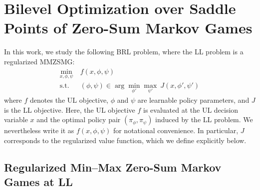 \documentclass{article}
\theoremstyle{plain}
\theoremstyle{definition}
\theoremstyle{remark}
\newcommand{\st}{{\mathrm{s.t.}}}
\def\R{\mathbb R}
\def\cA{\mathcal A}
\def\cB{\mathcal B}
\def\cM{\mathcal M}
\def\cP{\mathcal P}
\def\cS{\mathcal S}
\begin{document}
\section{Bilevel Optimization over Saddle Points of Zero-Sum Markov Games}
\vspace{-1mm}
\label{sec: problem-formulation}

In this work, we study the following BRL problem, where the LL problem is a regularized MMZSMG:
\vspace{-2mm}
\begin{subequations}\label{problem: bilevel-min-max} 
\begin{align} 
\min_{x, \phi,\psi} & \ f(x, \phi,\psi) 
\\ 
\st & \ (\phi,\psi) \in \arg\min_{\phi'}\max_{\psi'} \ J(x,\phi',\psi') \label{eq.minmaxgame}
\end{align}  
\end{subequations}
where $f$ denotes the UL objective, $\phi$ and $\psi$ are learnable policy parameters, and $J$ is the LL objective. Here, the UL objective $f$ is evaluated at the UL decision variable $x$ and the optimal policy pair $(\pi_\phi,\pi_\psi)$ induced by the LL problem. 
We nevertheless write it as $f(x,\phi,\psi)$ for notational convenience. In particular, $J$ corresponds to the regularized value function, which we define explicitly below. 

\vspace{-2mm}
\subsection{Regularized Min--Max Zero-Sum Markov Games at LL}
\vspace{-2mm}
\end{document}
